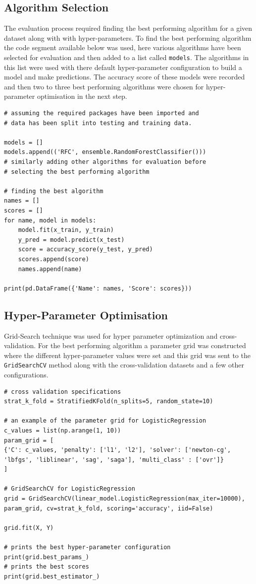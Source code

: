 \subsection*{Algorithm Selection}

The evaluation process required finding the best performing algorithm for a given dataset along with with hyper-parameters. To find the best performing algorithm the code segment available below was used, here various algorithms have been selected for evaluation and then added to a list called \texttt{models}. The algorithms in this list were used with there default hyper-parameter configuration to build a model and make predictions. The accuracy score of these models were recorded and then two to three best performing algorithms were chosen for hyper-parameter optimisation in the next step.

\begin{lstlisting}
# assuming the required packages have been imported and 
# data has been split into testing and training data.

models = []
models.append(('RFC', ensemble.RandomForestClassifier()))
# similarly adding other algorithms for evaluation before 
# selecting the best performing algorithm

# finding the best algorithm
names = []
scores = []
for name, model in models:
    model.fit(x_train, y_train)
    y_pred = model.predict(x_test)
    score = accuracy_score(y_test, y_pred)
    scores.append(score)
    names.append(name)

print(pd.DataFrame({'Name': names, 'Score': scores}))
\end{lstlisting}

\subsection*{Hyper-Parameter Optimisation}

Grid-Search technique was used for hyper parameter optimization and cross-validation. For the best performing algorithm a parameter grid was constructed where the different hyper-parameter values were set and this grid was sent to the \texttt{GridSearchCV} method along with the cross-validation datasets and a few other configurations. 

\begin{lstlisting}
# cross validation specifications
strat_k_fold = StratifiedKFold(n_splits=5, random_state=10)

# an example of the parameter grid for LogisticRegression
c_values = list(np.arange(1, 10))
param_grid = [
{'C': c_values, 'penalty': ['l1', 'l2'], 'solver': ['newton-cg', 'lbfgs', 'liblinear', 'sag', 'saga'], 'multi_class' : ['ovr']}
]

# GridSearchCV for LogisticRegression
grid = GridSearchCV(linear_model.LogisticRegression(max_iter=10000), param_grid, cv=strat_k_fold, scoring='accuracy', iid=False)

grid.fit(X, Y)

# prints the best hyper-parameter configuration
print(grid.best_params_)
# prints the best scores
print(grid.best_estimator_)
\end{lstlisting}


